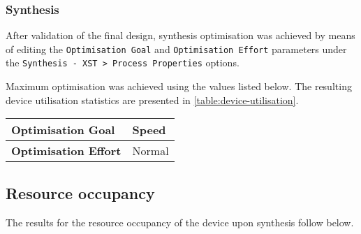 \subsubsection*{Synthesis}
After validation of the final design, synthesis optimisation was achieved by means of editing the \texttt{Optimisation Goal} and \texttt{Optimisation Effort} parameters under the \texttt{Synthesis - XST > Process Properties} options.

Maximum optimisation was achieved using the values listed below. The resulting device utilisation statistics are presented in \autoref{table:device-utilisation}.

\begin{table}[!h]
\center
\begin{tabular}{|p{6cm}|p{2cm}|}
\hline
\textbf{Optimisation Goal}   & Speed  \\ \hline
\textbf{Optimisation Effort} & Normal \\ \hline
\end{tabular}
\end{table}

\subsection{Resource occupancy}

The results for the resource occupancy of the device upon synthesis follow below.

